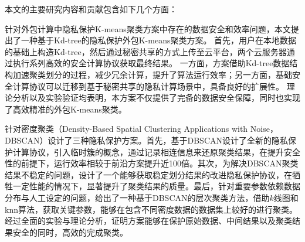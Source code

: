 \begin{cabstract}
本文的主要研究内容和贡献包含如下几个方面：
\begin{compactenum}
\item 针对外包计算中隐私保护K-means聚类方案中存在的数据安全和效率问题，本文提出了一种基于Kd-tree的隐私保护外包K-means聚类方案。
首先，用户在本地数据的基础上构造Kd-tree，然后通过秘密共享的方式上传至云平台，两个云服务器通过执行系列高效的安全计算协议获取最终结果。
一方面，方案借助Kd-tree数据结构加速聚类划分的过程，减少冗余计算，提升了算法运行效率；另一方面，基础安全计算协议可以迁移到基于秘密共享的隐私计算场景中，具备良好的扩展性。
理论分析以及实验验证均表明，本方案不仅提供了完备的数据安全保障，同时也实现了高效精准的外包K-means聚类。

\item 针对密度聚类（Density-Based Spatial Clustering Applications with Noise，DBSCAN）设计了三种隐私保护方案。首先，基于DBSCAN设计了全新的隐私保护计算协议，引入临时簇的概念，通过记录相连信息来还原聚类结果，在提升安全性的前提下，运行效率相较于前沿方案提升近100倍。其次，为解决DBSCAN聚类结果不稳定的问题，设计了一个能够获取稳定划分结果的改进隐私保护协议，在牺牲一定性能的情况下，显著提升了聚类结果的质量。最后，针对重要参数依赖数据分布与人工设定的问题，给出了一种基于DBSCAN的层次聚类方法，借助$ k $线图和knn算法，获取关键参数，能够在包含不同密度数据的数据集上较好的进行聚类。经过全面的实验与理论分析，证明方案能够在保护原始数据、中间结果以及聚类结果安全的同时，高效的完成聚类。   
\end{compactenum}                                               
\end{cabstract}

